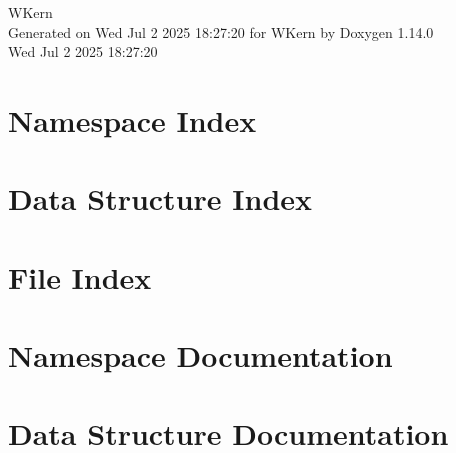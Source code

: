\documentclass[twoside]{book}
\newcommand{\+}{\discretionary{\mbox{\scriptsize$\hookleftarrow$}}{}{}}
\newcommand{\clearemptydoublepage}{%
    \newpage{\pagestyle{empty}\cleardoublepage}%
  }
\begin{document}
  \raggedbottom
    \hypersetup{pageanchor=false,
                bookmarksnumbered=true,
                pdfencoding=unicode
               }
  \begin{titlepage}
  \vspace*{7cm}
  \begin{center}%
  {\Large WKern}\\
  \vspace*{1cm}
  {\large Generated on Wed Jul 2 2025 18\+:27\+:20 for WKern by Doxygen 1.14.0}\\
    \vspace*{0.5cm}
    {\small Wed Jul 2 2025 18:27:20}
  \end{center}
  \end{titlepage}
  \clearemptydoublepage
  \tableofcontents
  \clearemptydoublepage
  \hypersetup{pageanchor=true}
\chapter{Namespace Index}

\chapter{Data Structure Index}

\chapter{File Index}

\chapter{Namespace Documentation}







\chapter{Data Structure Documentation}














\end{document}
